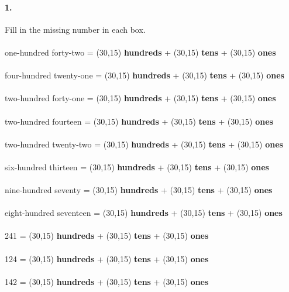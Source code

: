 \documentclass[12pt]{article}
\begin{document}
\paragraph{1.}
Fill in the missing number in each box. \\
\\
one-hundred forty-two = \framebox(30,15){} \textbf{hundreds} + \framebox(30,15){} \textbf{tens} + \framebox(30,15){} \textbf{ones}
\\
\\
four-hundred twenty-one = \framebox(30,15){} \textbf{hundreds} + \framebox(30,15){} \textbf{tens} + \framebox(30,15){} \textbf{ones}
\\
\\
two-hundred forty-one = \framebox(30,15){} \textbf{hundreds} + \framebox(30,15){} \textbf{tens} + \framebox(30,15){} \textbf{ones}
\\
\\
two-hundred fourteen = \framebox(30,15){} \textbf{hundreds} + \framebox(30,15){} \textbf{tens} + \framebox(30,15){} \textbf{ones}
\\
\\
two-hundred twenty-two = \framebox(30,15){} \textbf{hundreds} + \framebox(30,15){} \textbf{tens} + \framebox(30,15){} \textbf{ones}
\\
\\
six-hundred thirteen = \framebox(30,15){} \textbf{hundreds} + \framebox(30,15){} \textbf{tens} + \framebox(30,15){} \textbf{ones}
\\
\\
nine-hundred seventy = \framebox(30,15){} \textbf{hundreds} + \framebox(30,15){} \textbf{tens} + \framebox(30,15){} \textbf{ones}
\\
\\
eight-hundred seventeen = \framebox(30,15){} \textbf{hundreds} + \framebox(30,15){} \textbf{tens} + \framebox(30,15){} \textbf{ones}
\\
\\
241 = \framebox(30,15){} \textbf{hundreds} + \framebox(30,15){} \textbf{tens} + \framebox(30,15){} \textbf{ones}
\\
\\
124 = \framebox(30,15){} \textbf{hundreds} + \framebox(30,15){} \textbf{tens} + \framebox(30,15){} \textbf{ones}
\\
\\
142 = \framebox(30,15){} \textbf{hundreds} + \framebox(30,15){} \textbf{tens} + \framebox(30,15){} \textbf{ones}
\\
\\
\end{document}
